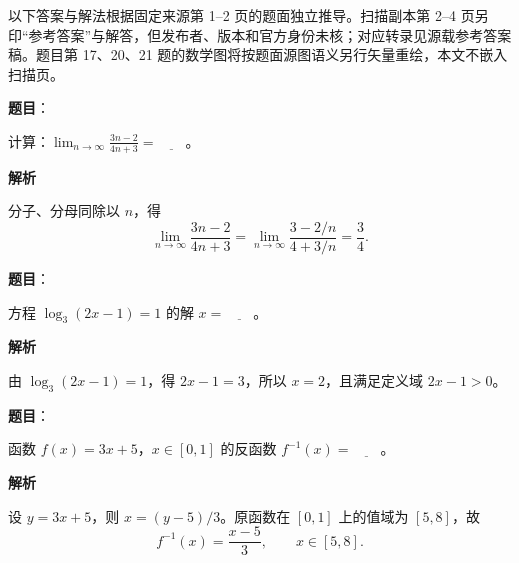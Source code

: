 

\begin{gktip}
以下答案与解法根据固定来源第 1–2 页的题面独立推导。扫描副本第 2–4 页另印“参考答案”与解答，但发布者、版本和官方身份未核；对应转录见源载参考答案稿。题目第 17、20、21 题的数学图将按题面源图语义另行矢量重绘，本文不嵌入扫描页。
\end{gktip}

\begin{answer}

\textbf{题目}：

计算：$\displaystyle\lim_{n\to\infty}\frac{3n-2}{4n+3}=\underline{\qquad}$。

\textbf{解析}

分子、分母同除以 $n$，得
\nopagebreak[4]
\[
\lim_{n\to\infty}\frac{3n-2}{4n+3}
=\lim_{n\to\infty}\frac{3-2/n}{4+3/n}=\frac34.
\]


\end{answer}
\begin{answer}

\textbf{题目}：

方程 $\log_3(2x-1)=1$ 的解 $x=\underline{\qquad}$。

\textbf{解析}

由 $\log_3(2x-1)=1$，得 $2x-1=3$，所以 $x=2$，且满足定义域 $2x-1>0$。


\end{answer}
\begin{answer}

\textbf{题目}：

函数 $f(x)=3x+5$，$x\in[0,1]$ 的反函数 $f^{-1}(x)=\underline{\qquad}$。

\textbf{解析}

设 $y=3x+5$，则 $x=(y-5)/3$。原函数在 $[0,1]$ 上的值域为 $[5,8]$，故
\nopagebreak[4]
\[
f^{-1}(x)=\frac{x-5}{3},\qquad x\in[5,8].
\]


\end{answer}
